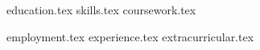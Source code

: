 \documentclass[11pt, letterpaper]{awesome-cv}
\newcommand*{\sectiondir}{resume/}
\begin{document}
\makecvheader

\begin{minipage}[t]{0.32\textwidth} 

{education.tex}
{skills.tex}
{coursework.tex}

\end{minipage} 
\hfill
\begin{minipage}[t]{0.66\textwidth} 

{employment.tex}
{experience.tex}
{extracurricular.tex}

\end{minipage} 
\end{document}
